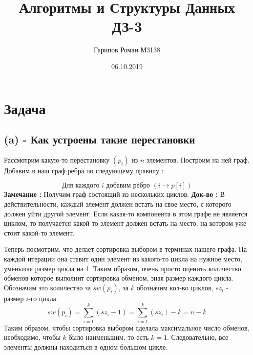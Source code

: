 \documentclass{article}
\title{Алгоритмы и Структуры Данных ДЗ-3}
\date{06.10.2019}
\author{Гарипов Роман М3138}
\begin{document}
  \maketitle
  \newpage


\section*{Задача }
\subsection*{(a) - Как устроены такие перестановки}
Рассмотрим какую-то перестановку $(p_{i})$ из $n$ элементов. Построим на ней граф. Добавим в наш граф ребра по следующему правилу : 

$$\mbox{Для каждого } i \mbox{ добавим ребро } (i \rightarrow p[i])$$
\textbf{Замечание :} Получим граф состоящий из нескольких циклов.
\newline
\textbf{Док-во :} В действительности, каждый элемент должен встать на свое место, с которого должен уйти другой элемент. Если какая-то компонента в этом графе не является циклом, то получается какой-то элемент должен встать на место, на котором уже стоит какой-то элемент.
\begin{comment}
Рассмотрим ребро $(v \rightarrow u)$. Наличие этого ребра говорит нам о том, что элемент $v$ должен встать на место элемента $p[u]$, для того, чтобы перестановка $p_{i}$ была упорядочена. Ведь чтобы перестановка была упорядочена, необходимо следующее условие :
$$\forall i, \mbox{ } 1 \leq i \leq n :  p[i] = i$$
Понятно, что если поставить какой-то $p[x]$ на место с индексом $p[x]$, а $p[p[x]]$ на место с индексом $p[p[x]]$ \dots , получим отсортированную перестановку.
\end{comment}
\newline
Теперь посмотрим, что делает сортировка выбором в терминах нашего графа. На каждой итерации она ставит один элемент из какого-то цикла на нужное место, уменьшая размер цикла на 1. 
\newline
Таким образом, очень просто оценить количество обменов которое выполнит сортировка обменом, зная размер каждого цикла. Обозначим это количество за $sw(p_{i})$, за $k$ обозначим кол-во циклов, $sz_{i}$ - размер $i$-го цикла.
$$sw(p_{i}) = \sum_{i = 1}^{k}(sz_{i} - 1) = \sum_{i = 1}^{k}(sz_{i}) - k = n - k$$
Таким образом, чтобы сортировка выбором сделала максимальное число обменов, необходимо, чтобы $k$ было наименьшим, то есть $k = 1$. Следовательно, все элементы должны находиться в одном большом цикле.
\end{document}
